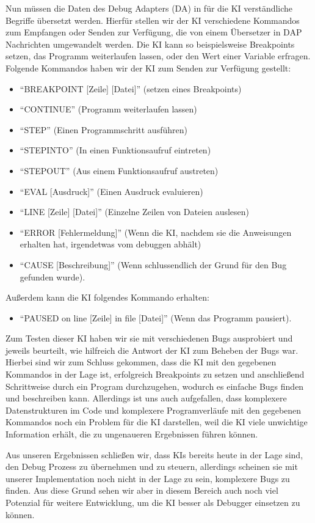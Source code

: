\documentclass[a4paper,12pt,ngerman]{scrartcl}
\begin{document}
Nun müssen die Daten des Debug Adapters (DA) in für die KI verständliche Begriffe übersetzt werden. Hierfür stellen wir der KI verschiedene Kommandos zum Empfangen oder Senden zur Verfügung, die von einem Übersetzer in DAP Nachrichten umgewandelt werden. Die KI kann so beispielsweise Breakpoints setzen, das Programm weiterlaufen lassen, oder den Wert einer Variable erfragen. Folgende Kommandos haben wir der KI zum Senden zur Verfügung gestellt:
\begin{itemize}
	\item ``BREAKPOINT [Zeile] [Datei]'' (setzen eines Breakpoints)
	\item ``CONTINUE'' (Programm weiterlaufen lassen)
	\item ``STEP'' (Einen Programmschritt ausführen)
	\item ``STEPINTO'' (In einen Funktionsaufruf eintreten)
	\item ``STEPOUT'' (Aus einem Funktionsaufruf austreten)
	\item ``EVAL [Ausdruck]'' (Einen Ausdruck evaluieren)
	\item ``LINE [Zeile] [Datei]'' (Einzelne Zeilen von Dateien auslesen)
	\item ``ERROR [Fehlermeldung]'' (Wenn die KI, nachdem sie die Anweisungen erhalten hat, irgendetwas vom debuggen abhält)
	\item ``CAUSE [Beschreibung]'' (Wenn schlussendlich der Grund für den Bug gefunden wurde).
\end{itemize}
Außerdem kann die KI folgendes Kommando erhalten:
\begin{itemize}
	\item ``PAUSED on line [Zeile] in file [Datei]'' (Wenn das Programm pausiert).
\end{itemize}

Zum Testen dieser KI haben wir sie mit verschiedenen Bugs ausprobiert und jeweils beurteilt, wie hilfreich die Antwort der KI zum Beheben der Bugs war. Hierbei sind wir zum Schluss gekommen, dass die KI mit den gegebenen Kommandos in der Lage ist, erfolgreich Breakpoints zu setzen und anschließend Schrittweise durch ein Program durchzugehen, wodurch es einfache Bugs finden und beschreiben kann. Allerdings ist uns auch aufgefallen, dass komplexere Datenstrukturen im Code und komplexere Programverläufe mit den gegebenen Kommandos noch ein Problem für die KI darstellen, weil die KI viele unwichtige Information erhält, die zu ungenaueren Ergebnissen führen können.

Aus unseren Ergebnissen schließen wir, dass KIs bereits heute in der Lage sind, den Debug Prozess zu übernehmen und zu steuern, allerdings scheinen sie mit unserer Implementation noch nicht in der Lage zu sein, komplexere Bugs zu finden. Aus diese Grund sehen wir aber in diesem Bereich auch noch viel Potenzial für weitere Entwicklung, um die KI besser als Debugger einsetzen zu können.
\end{document}
